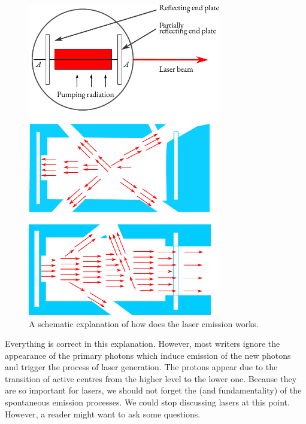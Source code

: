 \begin{figure}[!ht]
\centering
\includegraphics[width=0.75\textwidth]{figures/laser.pdf}
\caption{ A schematic explanation of how does the laser emission works.
\label{laser}}
\end{figure}

Everything is correct in this explanation. However, most writers
ignore the appearance of the primary photons which induce emission of
the new photons and trigger the process of laser generation. The protons
appear due to the  transition of active centres from the
higher level to the lower one. Because they are so important for lasers,
we should not forget the  (and fundamentality) of the
spontaneous emission processes. We could stop discussing lasers at this
point. However, a reader might want to ask some questions.

